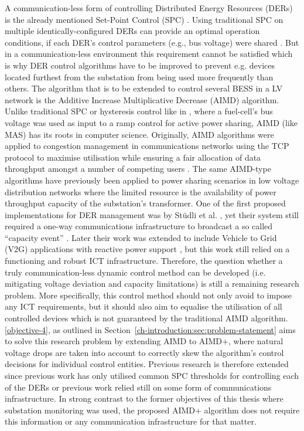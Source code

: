 A communication-less form of controlling Distributed Energy Resources (DERs) is the already mentioned Set-Point Control (SPC) \cite{Leadbetter2012}.
Using traditional SPC on multiple identically-configured DERs can provide an optimal operation conditions, if each DER's control parameters (e.g., bus voltage) were shared \cite{Thieblemont2017a}.
But in a communication-less environment this requirement cannot be satisfied which is why DER control algorithms have to be improved to prevent e.g. devices located furthest from the substation from being used more frequently than others.
The algorithm that is to be extended to control several BESS in a LV network is the Additive Increase Multiplicative Decrease (AIMD) algorithm.
Unlike traditional SPC or hysteresis control like in \cite{Jiang2007}, where a fuel-cell's bus voltage was used as input to a ramp control for active power sharing, AIMD (like MAS) has its roots in computer science.
Originally, AIMD algorithms were applied to congestion management in communications networks using the TCP protocol \cite{Chiu1989} to maximise utilisation while ensuring a fair allocation of data throughput amongst a number of competing users \cite{Wirth2014}.
The same AIMD-type algorithms have previously been applied to power sharing scenarios in low voltage distribution networks where the limited resource is the availability of power throughput capacity of the substation's transformer.
One of the first proposed implementations for DER management was by St{\"{u}}dli et al. \cite{Studli2012}, yet their system still required a one-way communications infrastructure to broadcast a so called ``capacity event'' \cite{Studli2014, Studli2014a}.
Later their work was extended to include Vehicle to Grid (V2G) applications with reactive power support \cite {Studli2015}, but this work still relied on a functioning and robust ICT infrastructure.
Therefore, the question whether a truly communication-less dynamic control method can be developed (i.e. mitigating voltage deviation and capacity limitations) is still a remaining research problem.
More specifically, this control method should not only avoid to impose any ICT requirements, but it should also aim to equalise the utilisation of all controlled devices which is not guaranteed by the traditional AIMD algorithm.
\ref{objective-4}, as outlined in Section~\ref{ch-introduction:sec:problem-statement} aims to solve this research problem by extending AIMD to AIMD+, where natural voltage drops are taken into account to correctly skew the algorithm's control decisions for individual control entities.
Previous research is therefore extended since previous work has only utilised common SPC thresholds for controlling each of the DERs or previous work relied still on some form of communications infrastructure.
In strong contrast to the former objectives of this thesis where substation monitoring was used, the proposed AIMD+ algorithm does not require this information or any communication infrastructure for that matter.
